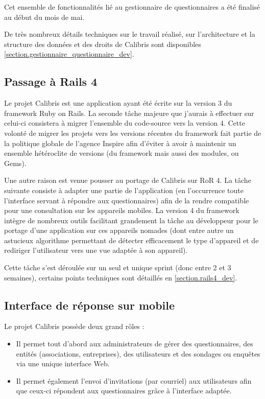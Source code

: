 \documentclass[12pt,a4paper]{book}
\begin{document}
Cet ensemble de fonctionnalités lié au gestionnaire de questionnaires a été finalisé au début du mois de mai.

De très nombreux détails techniques sur le travail réalisé, sur l'architecture et la structure des données et des droits de Calibris sont disponibles \cref{section.gestionnaire_questionnaire_dev}.

\subsection{Passage à Rails 4}

Le projet Calibris est une application ayant été écrite sur la version 3 du framework Ruby on Rails. La seconde tâche majeure que j'aurais à effectuer sur celui-ci consistera à migrer l'ensemble du code-source vers la version 4. Cette volonté de migrer les projets vers les versions récentes du framework fait partie de la politique globale de l'agence Inspire afin d'éviter à avoir à maintenir un ensemble hétéroclite de versions (du framework mais aussi des modules, ou Gems).

Une autre raison est venue pousser au portage de Calibris sur RoR 4. La tâche suivante consiste à adapter une partie de l'application (en l'occurrence toute l'interface servant à répondre aux questionnaires) afin de la rendre compatible pour une consultation sur les appareils mobiles. La version 4 du framework intègre de nombreux outils facilitant grandement la tâche au développeur pour le portage d'une application sur ces appareils nomades (dont entre autre un astucieux algorithme permettant de détecter efficacement le type d'appareil et de rediriger l'utilisateur vers une vue adaptée à son appareil).

Cette tâche s'est déroulée sur un seul et unique sprint (donc entre 2 et 3 semaines), certains points techniques sont détaillés en \cref{section.rails4_dev}.

\subsection{Interface de réponse sur mobile}

Le projet Calibris possède deux grand rôles :
\begin{itemize}
  \item Il permet tout d'abord aux administrateurs de gérer des questionnaires, des entités (associations, entreprises), des utilisateurs et des sondages ou enquêtes via une unique interface Web.
  \item Il permet également l'envoi d'invitations (par courriel) aux utilisateurs afin que ceux-ci répondent aux questionnaires grâce à l'interface adaptée.  
\end{itemize}
\end{document}
